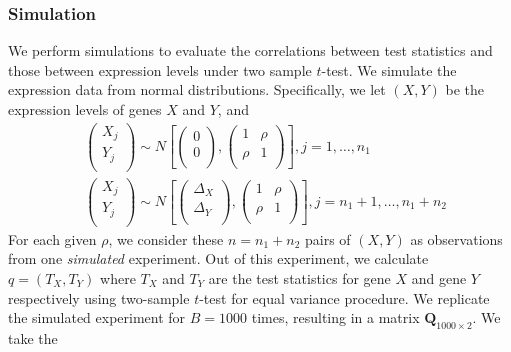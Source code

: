 \subsubsection{Simulation}
We perform simulations to evaluate the correlations between test statistics and those between 
expression levels under two sample $t$-test. We simulate the expression data from normal 
distributions. Specifically, we let $(X, Y)$ be the expression levels of genes $X$ and $Y$, and
\begin{equation}
\begin{aligned}
&\left( \begin{array}{c}
X_{j}\\
Y_{j}\\
\end{array}\right)
\sim N\left[
\left(\begin{array}{c}
0\\
0\\
\end{array} \right), 
\left(
\begin{array}{cc}
1 &\rho  \\
\rho & 	1 \\
\end{array}
\right)
\right], j = 1, \ldots, n_1 \\
& \left( \begin{array}{c}
X_{j}\\
Y_{j}\\
\end{array}\right)
\sim N\left[
\left(\begin{array}{c}
\Delta_X\\
\Delta_Y\\
\end{array} \right), 
\left(
\begin{array}{cc}
1 &\rho \\
\rho  & 	1 \\
\end{array}
\right)
\right], j = n_1 +1, \ldots, n_1 + n_2 
\end{aligned}
\end{equation}
For each given $\rho$, we 
consider these $n=n_1 + n_2$ pairs of $(X, Y)$
as observations from one \textit{simulated} experiment. Out of this experiment, we calculate $q 
= (T_X, T_Y)$ where $T_X$ and $T_Y$ are the test statistics for gene $X$ and gene $Y$ 
respectively using 
two-sample $t$-test for equal variance procedure. We replicate the simulated
experiment for $B=1000$ times, resulting in a matrix $\bm Q_{1000\times 2}$. We take the 

